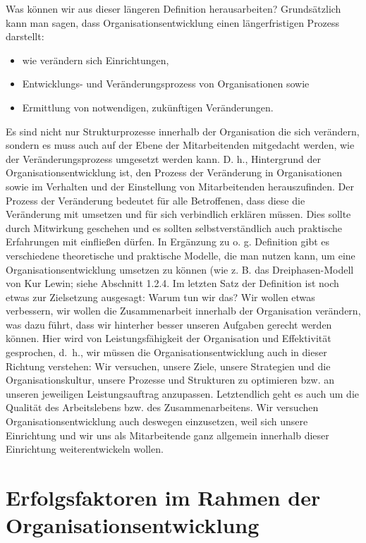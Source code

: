 \documentclass[
  letterpaper,
]{book}
\begin{document}
Was können wir aus dieser längeren Definition herausarbeiten?
Grundsätzlich kann man sagen, dass Organisationsentwicklung einen
längerfristigen Prozess darstellt:

\begin{itemize}
\item
  wie verändern sich Einrichtungen,
\item
  Entwicklungs- und Veränderungsprozess von Organisationen sowie
\item
  Ermittlung von notwendigen, zukünftigen Veränderungen.
\end{itemize}

Es sind nicht nur Strukturprozesse innerhalb der Organisation die sich
verändern, sondern es muss auch auf der Ebene der Mitarbeitenden
mitgedacht werden, wie der Veränderungsprozess umgesetzt werden kann. D.
h., Hintergrund der Organisationsentwicklung ist, den Prozess der
Veränderung in Organisationen sowie im Verhalten und der Einstellung von
Mitarbeitenden herauszufinden. Der Prozess der Veränderung bedeutet für
alle Betroffenen, dass diese die Veränderung mit umsetzen und für sich
verbindlich erklären müssen. Dies sollte durch Mitwirkung geschehen und
es sollten selbstverständlich auch praktische Erfahrungen mit einfließen
dürfen. In Ergänzung zu o. g. Definition gibt es verschiedene
theoretische und praktische Modelle, die man nutzen kann, um eine
Organisationsentwicklung umsetzen zu können (wie z. B. das
Dreiphasen-Modell von Kur Lewin; siehe Abschnitt 1.2.4. Im letzten Satz
der Definition ist noch etwas zur Zielsetzung ausgesagt: Warum tun wir
das? Wir wollen etwas verbessern, wir wollen die Zusammenarbeit
innerhalb der Organisation verändern, was dazu führt, dass wir hinterher
besser unseren Aufgaben gerecht werden können. Hier wird von
Leistungsfähigkeit der Organisation und Effektivität gesprochen, d.~h.,
wir müssen die Organisationsentwicklung auch in dieser Richtung
verstehen: Wir versuchen, unsere Ziele, unsere Strategien und die
Organisationskultur, unsere Prozesse und Strukturen zu optimieren bzw.
an unseren jeweiligen Leistungsauftrag anzupassen. Letztendlich geht es
auch um die Qualität des Arbeitslebens bzw. des Zusammenarbeitens. Wir
versuchen Organisationsentwicklung auch deswegen einzusetzen, weil sich
unsere Einrichtung und wir uns als Mitarbeitende ganz allgemein
innerhalb dieser Einrichtung weiterentwickeln wollen.

\section{Erfolgsfaktoren im Rahmen der
Organisationsentwicklung}\label{erfolgsfaktoren-im-rahmen-der-organisationsentwicklung}
\end{document}
